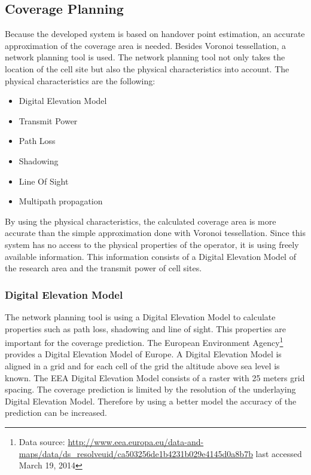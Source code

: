 \documentclass[master,english]{hgbthesis}
\begin{document}
\subsection{Coverage Planning}
Because the developed system is based on handover point estimation, an accurate approximation of the coverage area is needed. Besides Voronoi tessellation, a network planning tool is used. The network planning tool not only takes the location of the cell site but also the physical characteristics into account. The physical characteristics are the following:
\begin{itemize}
	\item Digital Elevation Model
	\item Transmit Power
	\item Path Loss
	\item Shadowing
	\item Line Of Sight
	\item Multipath propagation
\end{itemize} 
By using the physical characteristics, the calculated coverage area is more accurate than the simple approximation done with Voronoi tessellation. Since this system has no access to the physical properties of the operator, it is using freely available information. This information consists of a Digital Elevation Model of the research area and the transmit power of cell sites. 
\subsubsection{Digital Elevation Model}
The network planning tool is using a Digital Elevation Model to calculate properties such as path loss, shadowing and line of sight. This properties are important for the coverage prediction. The European Environment Agency\footnote{Data source: \url{http://www.eea.europa.eu/data-and-maps/data/ds_resolveuid/ca503256de1b4231b029e4145d0a8b7b} last accessed March 19, 2014} provides a Digital Elevation Model of Europe. A Digital Elevation Model is aligned in a grid and for each cell of the grid the altitude above sea level is known. The EEA Digital Elevation Model consists of a raster with 25 meters grid spacing. The coverage prediction is limited by the resolution of the underlaying Digital Elevation Model. Therefore by using a better model the accuracy of the prediction can be increased. 
\end{document}
